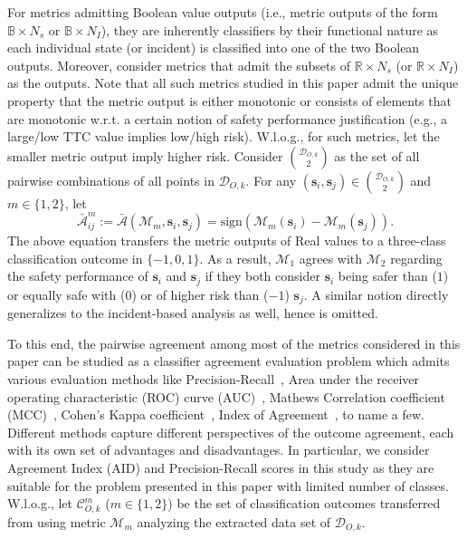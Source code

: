 \documentclass[journal]{IEEEtran}
\newcommand{\R}{\mathbb{R}}
\newcommand{\s}{\mathbf{s}}
\begin{document}
For metrics admitting Boolean value outputs (i.e., metric outputs of the form $\mathbb{B} \times N_s$ or $\mathbb{B} \times N_I$), they are inherently classifiers by their functional nature as each individual state (or incident) is classified into one of the two Boolean outputs. Moreover, consider metrics that admit the subsets of $\R \times N_s$ (or $\R \times N_I$) as the outputs. Note that all such metrics studied in this paper admit the unique property that the metric output is either monotonic or consists of elements that are monotonic w.r.t. a certain notion of safety performance justification (e.g., a large/low TTC value implies low/high risk). W.l.o.g., for such metrics, let the smaller metric output imply higher risk. Consider ${\mathcal{D}_{O, k} \choose 2}$ as the set of all pairwise combinations of all points in $\mathcal{D}_{O, k}$. For any $(\s_i, \s_j) \in {\mathcal{D}_{O, k} \choose 2}$ and $m \in \{1,2\}$, let
\begin{equation}\label{eq:real_to_class}
    \bar{\mathcal{A}}_{ij}^{m}:=\bar{\mathcal{A}}(\mathcal{M}_m, \s_i, \s_j) = \text{sign}(\mathcal{M}_m(\s_i)-\mathcal{M}_m(\s_j)).
\end{equation}
The above equation transfers the metric outputs of Real values to a three-class classification outcome in $\{-1, 0, 1\}$. As a result, $\mathcal{M}_1$ agrees with $\mathcal{M}_2$ regarding the safety performance of $\s_i$ and $\s_j$ if they both consider $\s_i$ being safer than ($1$) or equally safe with ($0$) or of higher risk than ($-1$) $\s_j$. A similar notion directly generalizes to the incident-based analysis as well, hence is omitted.

To this end, the pairwise agreement among most of the metrics considered in this paper can be studied as a classifier agreement evaluation problem which admits various evaluation methods like Precision-Recall~\cite{he2009learning}, Area under the receiver operating characteristic (ROC) curve (AUC)~\cite{bradley1997use}, Mathews Correlation coefficient (MCC)~\cite{matthews1975comparison}, Cohen's Kappa coefficient~\cite{mchugh2012interrater}, Index of Agreement~\cite{willmott1981validation}, to name a few. Different methods capture different perspectives of the outcome agreement, each with its own set of advantages and disadvantages. In particular, we consider Agreement Index (AID) and Precision-Recall scores in this study as they are suitable for the problem presented in this paper with limited number of classes. W.l.o.g., let $\mathcal{C}^m_{O, k}$ ($m\in\{1,2\}$) be the set of classification outcomes transferred from using metric $\mathcal{M}_m$ analyzing the extracted data set of $\mathcal{D}_{O, k}$.
\end{document}
